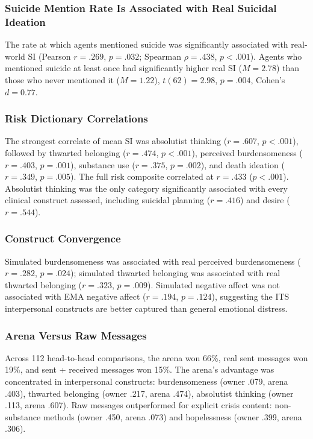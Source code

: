 \documentclass[review,12pt,authoryear]{elsarticle}
\begin{document}
\subsubsection{Suicide Mention Rate Is Associated with Real Suicidal Ideation}

The rate at which agents mentioned suicide was significantly associated with real-world SI (Pearson $r = .269$, $p = .032$; Spearman $\rho = .438$, $p < .001$). Agents who mentioned suicide at least once had significantly higher real SI ($M = 2.78$) than those who never mentioned it ($M = 1.22$), $t(62) = 2.98$, $p = .004$, Cohen's $d = 0.77$.

\subsubsection{Risk Dictionary Correlations}

The strongest correlate of mean SI was absolutist thinking ($r = .607$, $p < .001$), followed by thwarted belonging ($r = .474$, $p < .001$), perceived burdensomeness ($r = .403$, $p = .001$), substance use ($r = .375$, $p = .002$), and death ideation ($r = .349$, $p = .005$). The full risk composite correlated at $r = .433$ ($p < .001$). Absolutist thinking was the only category significantly associated with every clinical construct assessed, including suicidal planning ($r = .416$) and desire ($r = .544$).

\subsubsection{Construct Convergence}

Simulated burdensomeness was associated with real perceived burdensomeness ($r = .282$, $p = .024$); simulated thwarted belonging was associated with real thwarted belonging ($r = .323$, $p = .009$). Simulated negative affect was not associated with EMA negative affect ($r = .194$, $p = .124$), suggesting the ITS interpersonal constructs are better captured than general emotional distress.

\subsubsection{Arena Versus Raw Messages}

Across 112 head-to-head comparisons, the arena won 66\%, real sent messages won 19\%, and sent + received messages won 15\%. The arena's advantage was concentrated in interpersonal constructs: burdensomeness (owner .079, arena .403), thwarted belonging (owner .217, arena .474), absolutist thinking (owner .113, arena .607). Raw messages outperformed for explicit crisis content: non-substance methods (owner .450, arena .073) and hopelessness (owner .399, arena .306).
\end{document}
